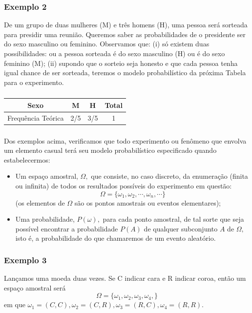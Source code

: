 \documentclass[14pt,aspectratio=1610]{beamer}
\begin{document}
\begin{frame}{}
\frametitle{Exemplo 2}
\begin{block}{}
\justifying
De um grupo de duas mulheres (M) e três homens (H), uma pessoa será sorteada para presidir uma reunião. Queremos saber as probabilidades de o presidente ser do sexo masculino ou feminino. Observamos que: (i) só existem duas possibilidades: ou a pessoa sorteada é do sexo masculino (H) ou é do sexo feminino (M); (ii) supondo que o sorteio seja honesto e que cada pessoa tenha igual chance de ser sorteada, teremos o modelo probabilístico da próxima Tabela para o experimento.
\end{block}
\end{frame}

\begin{frame}{}
\frametitle{}
\begin{block}{}
\centering
\begin{tabular}{c|c|c|c}
\hline
Sexo&M&H&Total\\
\hline
Frequência Teórica&2/5&3/5&1\\
\hline
\end{tabular}
\end{block}
\end{frame}

\begin{frame}{}
\frametitle{}
\begin{block}{}
\justifying
Dos exemplos acima, verificamos que todo experimento ou fenômeno que envolva
um elemento casual terá seu modelo probabilístico especificado quando estabelecermos:
\begin{itemize}
\item Um espaço amostral, $\Omega,$ que consiste, no caso discreto, da enumeração (finita ou infinita) de todos os resultados possíveis do experimento em questão:
$$\Omega=\{\omega_{1},\omega_{2},\cdots,\omega_{n},\cdots\}$$
(os elementos de $\Omega$ são os pontos amostrais ou eventos elementares);\pause
\item Uma probabilidade, $P(\omega),$ para cada ponto amostral, de tal sorte que seja possível encontrar a probabilidade $P(A)$ de qualquer subconjunto $A$ de $\Omega,$ isto é, a probabilidade do que chamaremos de um evento aleatório.
\end{itemize}
\end{block}
\end{frame}

\begin{frame}{}
\frametitle{Exemplo 3}
\begin{block}{}
\justifying
Lançamos uma moeda duas vezes. Se C indicar cara e R indicar coroa,
então um espaço amostral será $$\Omega=\{\omega_{1},\omega_{2},\omega_{3},\omega_{4},\}$$
em que $\omega_{1}=(C,C), \omega_{2}=(C,R),\omega_{3}=(R,C), \omega_{4}=(R,R).$ 
\end{block}
\end{frame}
\end{document}
